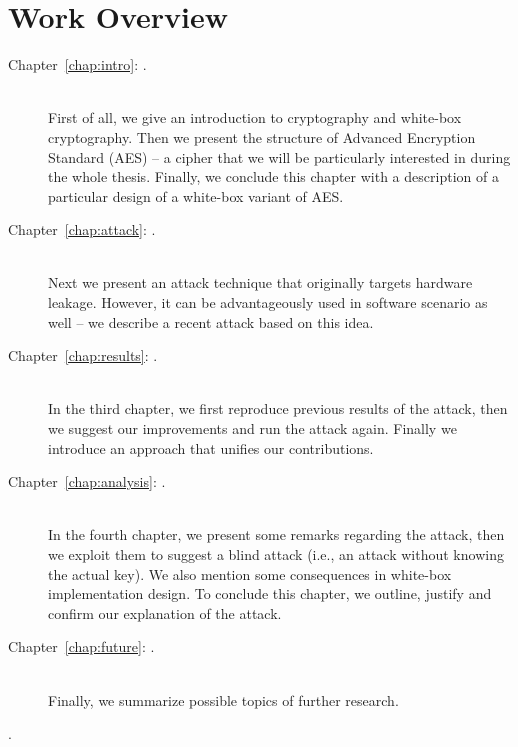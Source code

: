 \section*{Work Overview}
	\begin{description}
		\item[Chapter~\ref{chap:intro}: .] ~ \\
			First of all, we give an introduction to cryptography and white-box cryptography. Then we present the structure of Advanced Encryption Standard (AES) -- a cipher that we will be particularly interested in during the whole thesis. Finally, we conclude this chapter with a description of a particular design of a white-box variant of AES.
		\item[Chapter~\ref{chap:attack}: .] ~ \\
			Next we present an attack technique that originally targets hardware leakage. However, it can be advantageously used in software scenario as well -- we describe a recent attack based on this idea.
		\item[Chapter~\ref{chap:results}: .] ~ \\
			In the third chapter, we first reproduce previous results of the attack, then we suggest our improvements and run the attack again. Finally we introduce an approach that unifies our contributions.
		\item[Chapter~\ref{chap:analysis}: .] ~ \\
			In the fourth chapter, we present some remarks regarding the attack, then we exploit them to suggest a blind attack (i.e., an attack without knowing the actual key). We also mention some consequences in white-box implementation design. To conclude this chapter, we outline, justify and confirm our explanation of the attack.
		\item[Chapter~\ref{chap:future}: .] ~ \\
			Finally, we summarize possible topics of further research.
		\item[.]   %
	\end{description}
